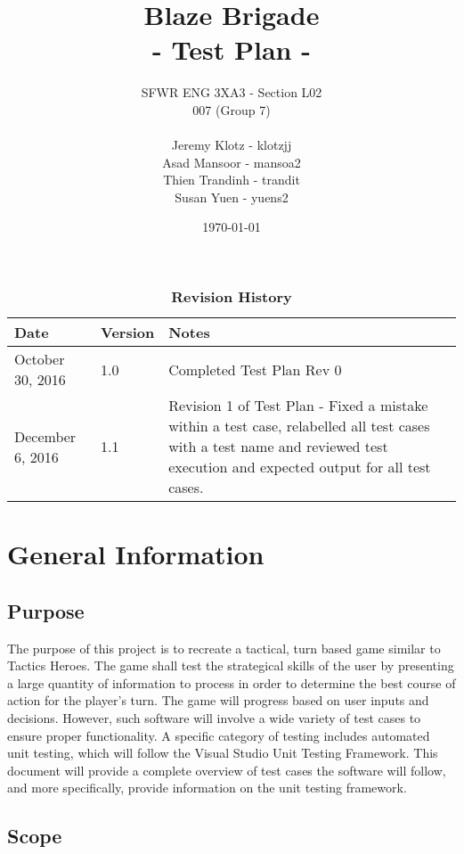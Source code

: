 \documentclass{article}
\title{
    \vspace{40mm}
	\textbf {
	\Huge {\color[rgb]{0.9,0,0}Blaze} Brigade \\
	\large - Test Plan -}}
\date{\today}
\author{SFWR ENG 3XA3 - Section L02 \\
	007 (Group 7) \\ \\
	Jeremy Klotz - klotzjj \\
	Asad Mansoor - mansoa2 \\
	Thien Trandinh - trandit \\
	Susan Yuen - yuens2}
\begin{document}
\maketitle
{}
\newpage
{}

\tableofcontents
\listoftables
\listoffigures

\begin{table}[bp]
\caption{\bf Revision History}
\begin{tabularx}{\textwidth}{p{3cm}p{2cm}X}
\toprule {\bf Date} & {\bf Version} & {\bf Notes} \\
\midrule
October 30, 2016 & 1.0 & Completed Test Plan Rev 0 \\
December 6, 2016 & 1.1 & Revision 1 of Test Plan - Fixed a mistake within a test case, relabelled all test cases with a test name and reviewed test execution and expected output for all test cases.\\
\bottomrule
\end{tabularx}
\end{table}

\newpage

\section{General Information}

\subsection{Purpose}

The purpose of this project is to recreate a tactical, turn based game similar to Tactics Heroes. The game shall test the strategical skills of the user by presenting a large quantity of information to process in order to determine the best course of action for the player's turn. The game will progress based on user inputs and decisions. However, such software will involve a wide variety of test cases to ensure proper functionality. A specific category of testing includes automated unit testing, which will follow the Visual Studio Unit Testing Framework. This document will provide a complete overview of test cases the software will follow, and more specifically, provide information on the unit testing framework.

\subsection{Scope}
\end{document}
